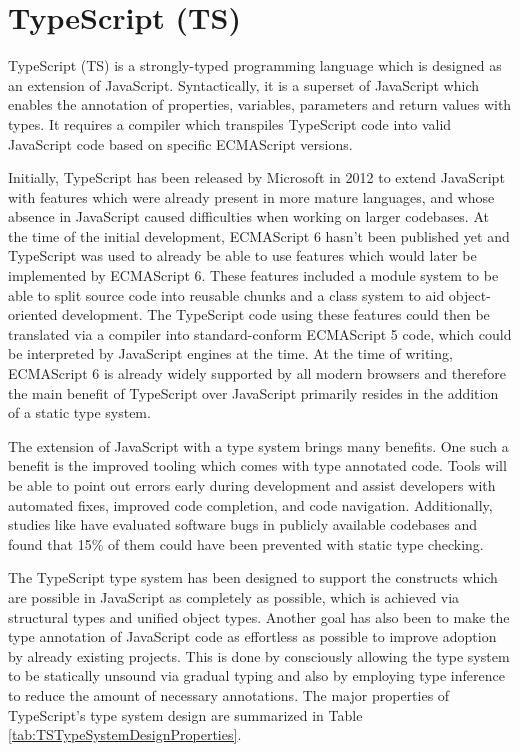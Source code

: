 \section{TypeScript (TS)}
\label{sec:TS}

TypeScript (TS) is a strongly-typed programming language which is designed as an extension of JavaScript. 
Syntactically, it is a superset of JavaScript which enables the annotation of properties, variables, parameters and return values with types. 
It requires a compiler which transpiles TypeScript code into valid JavaScript code based on specific ECMAScript versions.

Initially, TypeScript has been released by Microsoft in 2012 \parencite{TSFirstRelease} to extend JavaScript with features which were already present in more mature languages, and whose absence in JavaScript caused difficulties when working on larger codebases. 
At the time of the initial development, ECMAScript 6 hasn't been published yet and TypeScript was used to already be able to use features which would later be implemented by ECMAScript 6.
These features included a module system to be able to split source code into reusable chunks and a class system to aid object-oriented development. 
The TypeScript code using these features could then be translated via a compiler into standard-conform ECMAScript 5 code, which could be interpreted by JavaScript engines at the time. 
At the time of writing, ECMAScript 6 is already widely supported by all modern browsers and therefore the main benefit of TypeScript over JavaScript primarily resides in the addition of a static type system.

The extension of JavaScript with a type system brings many benefits. 
One such a benefit is the improved tooling which comes with type annotated code. 
Tools will be able to point out errors early during development and assist developers with automated fixes, improved code completion, and code navigation. 
Additionally, studies like \cite{ToTypeOrNotToType} have evaluated software bugs in publicly available codebases and found that 15\% of them could have been prevented with static type checking.

The TypeScript type system has been designed to support the constructs which are possible in JavaScript as completely as possible, which is achieved via structural types and unified object types. 
Another goal has also been to make the type annotation of JavaScript code as effortless as possible to improve adoption by already existing projects. 
This is done by consciously allowing the type system to be statically unsound via gradual typing and also by employing type inference to reduce the amount of necessary annotations. 
The major properties of TypeScript's type system design are summarized in Table \ref{tab:TSTypeSystemDesignProperties}.

